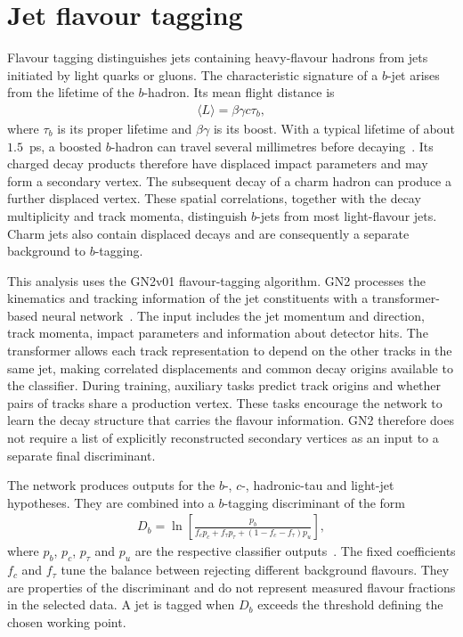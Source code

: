 \section{Jet flavour tagging}
\label{sec:ch6_btag}

Flavour tagging distinguishes jets containing heavy-flavour hadrons from jets initiated by light quarks or gluons.
The characteristic signature of a $b$-jet arises from the lifetime of the $b$-hadron.
Its mean flight distance is
\begin{align}
    \langle L\rangle = \beta\gamma c\tau_b,
    \label{eq:ch6_b_flight}
\end{align}
where $\tau_b$ is its proper lifetime and $\beta\gamma$ is its boost.
With a typical lifetime of about $1.5$~ps, a boosted $b$-hadron can travel several millimetres before decaying~\cite{ATLAS2026GN2}.
Its charged decay products therefore have displaced impact parameters and may form a secondary vertex.
The subsequent decay of a charm hadron can produce a further displaced vertex.
These spatial correlations, together with the decay multiplicity and track momenta, distinguish $b$-jets from most light-flavour jets.
Charm jets also contain displaced decays and are consequently a separate background to $b$-tagging.

This analysis uses the GN2v01 flavour-tagging algorithm.
GN2 processes the kinematics and tracking information of the jet constituents with a transformer-based neural network~\cite{ATLAS2026GN2}.
The input includes the jet momentum and direction, track momenta, impact parameters and information about detector hits.
The transformer allows each track representation to depend on the other tracks in the same jet, making correlated displacements and common decay origins available to the classifier.
During training, auxiliary tasks predict track origins and whether pairs of tracks share a production vertex.
These tasks encourage the network to learn the decay structure that carries the flavour information.
GN2 therefore does not require a list of explicitly reconstructed secondary vertices as an input to a separate final discriminant.

The network produces outputs for the $b$-, $c$-, hadronic-tau and light-jet hypotheses.
They are combined into a $b$-tagging discriminant of the form
\begin{align}
    D_b = \ln\!\left[
        \frac{p_b}
        {f_c p_c + f_\tau p_\tau +(1-f_c-f_\tau)p_u}
    \right],
    \label{eq:ch6_gn2_discriminant}
\end{align}
where $p_b$, $p_c$, $p_\tau$ and $p_u$ are the respective classifier outputs~\cite{ATLAS2026GN2}.
The fixed coefficients $f_c$ and $f_\tau$ tune the balance between rejecting different background flavours.
They are properties of the discriminant and do not represent measured flavour fractions in the selected data.
A jet is tagged when $D_b$ exceeds the threshold defining the chosen working point.

